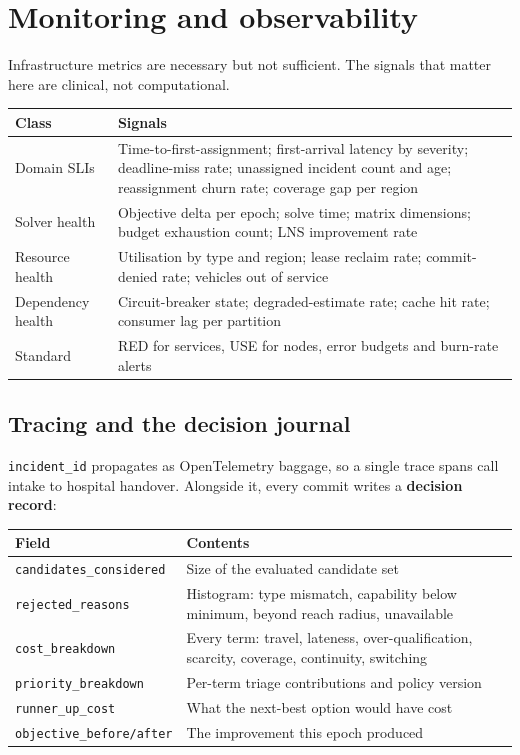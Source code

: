 \section{Monitoring and observability}

Infrastructure metrics are necessary but not sufficient. The signals that
matter here are clinical, not computational.

\begin{center}\footnotesize
\begin{tabular}{@{}lp{78mm}@{}}
\toprule
\textbf{Class} & \textbf{Signals} \\
\midrule
Domain SLIs & Time-to-first-assignment; first-arrival latency by severity; deadline-miss rate; unassigned incident count and age; reassignment churn rate; coverage gap per region \\
Solver health & Objective delta per epoch; solve time; matrix dimensions; budget exhaustion count; LNS improvement rate \\
Resource health & Utilisation by type and region; lease reclaim rate; commit-denied rate; vehicles out of service \\
Dependency health & Circuit-breaker state; degraded-estimate rate; cache hit rate; consumer lag per partition \\
Standard & RED for services, USE for nodes, error budgets and burn-rate alerts \\
\bottomrule
\end{tabular}
\end{center}

\subsection{Tracing and the decision journal}

\texttt{incident\_id} propagates as OpenTelemetry baggage, so a single trace
spans call intake to hospital handover. Alongside it, every commit writes a
\textbf{decision record}:

\begin{center}\footnotesize
\begin{tabular}{@{}ll@{}}
\toprule
\textbf{Field} & \textbf{Contents} \\
\midrule
\texttt{candidates\_considered} & Size of the evaluated candidate set \\
\texttt{rejected\_reasons} & Histogram: type mismatch, capability below minimum, beyond reach radius, unavailable \\
\texttt{cost\_breakdown} & Every term: travel, lateness, over-qualification, scarcity, coverage, continuity, switching \\
\texttt{priority\_breakdown} & Per-term triage contributions and policy version \\
\texttt{runner\_up\_cost} & What the next-best option would have cost \\
\texttt{objective\_before/after} & The improvement this epoch produced \\
\bottomrule
\end{tabular}
\end{center}

